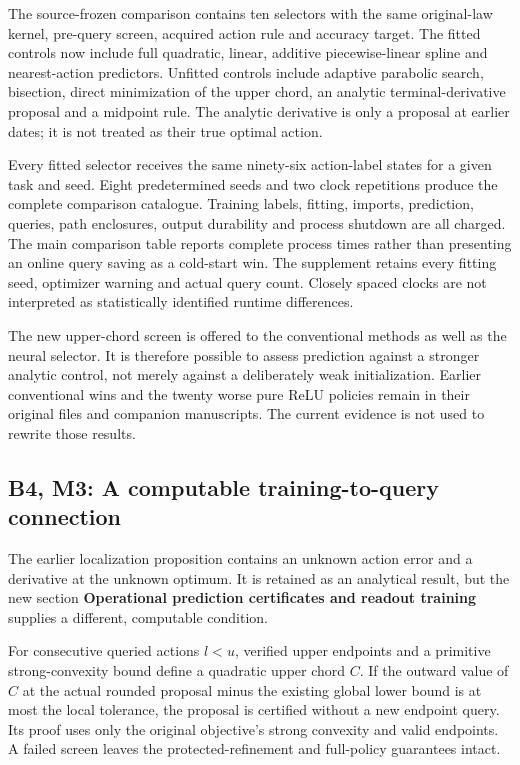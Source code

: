 \documentclass[ecta,nameyear,draft]{econsocart}
\begin{document}
The source-frozen comparison contains ten selectors with the same
original-law kernel, pre-query screen, acquired action rule and accuracy
target. The fitted controls now include full quadratic, linear, additive
piecewise-linear spline and nearest-action predictors. Unfitted controls
include adaptive parabolic search, bisection, direct minimization of the
upper chord, an analytic terminal-derivative proposal and a midpoint
rule. The analytic derivative is only a proposal at earlier dates; it is
not treated as their true optimal action.

Every fitted selector receives the same ninety-six action-label states
for a given task and seed. Eight predetermined seeds and two clock
repetitions produce the complete comparison catalogue. Training labels,
fitting, imports, prediction, queries, path enclosures, output
durability and process shutdown are all charged. The main comparison
table reports complete process times rather than presenting an online
query saving as a cold-start win. The supplement retains every fitting
seed, optimizer warning and actual query count. Closely spaced clocks
are not interpreted as statistically identified runtime differences.

The new upper-chord screen is offered to the conventional methods as
well as the neural selector. It is therefore possible to assess
prediction against a stronger analytic control, not merely against a
deliberately weak initialization. Earlier conventional wins and the
twenty worse pure ReLU policies remain in their original files and
companion manuscripts. The current evidence is not used to rewrite those
results.

\hypertarget{b4-m3-a-computable-training-to-query-connection}{%
\subsection{B4, M3: A computable training-to-query
connection}\label{b4-m3-a-computable-training-to-query-connection}}

The earlier localization proposition contains an unknown action error
and a derivative at the unknown optimum. It is retained as an analytical
result, but the new section \textbf{Operational prediction certificates
and readout training} supplies a different, computable condition.

For consecutive queried actions \(l<u\), verified upper endpoints and a
primitive strong-convexity bound define a quadratic upper chord \(C\).
If the outward value of \(C\) at the actual rounded proposal minus the
existing global lower bound is at most the local tolerance, the proposal
is certified without a new endpoint query. Its proof uses only the
original objective's strong convexity and valid endpoints. A failed
screen leaves the protected-refinement and full-policy guarantees
intact.
\end{document}
